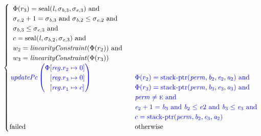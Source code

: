 \documentclass[a4paper]{article}
\newcommand{\tand}{\text{ and }}
\newcommand{\totherwise}{\text{otherwise }}
\newcommand{\sourcecolor}{\color{blue}}
\newcommand{\update}[2]{[#1 \mapsto #2]}
\newcommand{\updReg}[2]{\update{\reg.#1}{#2}}
\newcommand{\shareddom}[1]{\mathrm{#1}}
\newcommand{\perm}{\var{perm}}
\newcommand{\lin}{\var{l}}
\newcommand{\stkptr}[1]{\mathrm{stack\text{-}ptr}(#1)}
\newcommand{\seal}[1]{\shareddom{seal}(#1)}
\newcommand{\failed}{\mathrm{failed}}
\newcommand{\var}[1]{\mathit{#1}}
\newcommand{\reg}{\var{reg}}
\newcommand{\baddr}{\var{b}}
\newcommand{\eaddr}{\var{e}}
\newcommand{\aaddr}{\var{a}}
\newcommand{\plainperm}[1]{\textsc{#1}}
\newcommand{\enter}{\plainperm{e}}
\newcommand{\plainfun}[2]{
  \ifthenelse{\equal{#2}{}}
  {\mathit{#1}}
  {\mathit{#1}(#2)}
}
\newcommand{\updPcAddr}[1]{\plainfun{updatePc}{#1}}
\newcommand{\linCons}[1]{\plainfun{linearityConstraint}{#1}}
\begin{document}
\begin{align*}
\begin{cases}
\begin{array}[t]{l}
                                  \Phi(r_3) = \seal{\lin,\sigma_{\baddr,3},\sigma_{\eaddr,3}} \tand \\
                                  \sigma_{\eaddr,2}+1 = \sigma_{\baddr,3} \tand \sigma_{\baddr,2} \leq \sigma_{\eaddr,2} \tand\\
                                  \sigma_{\baddr,3} \leq \sigma_{\eaddr,3} \tand \\
                                  c = \seal{\lin,\sigma_{\baddr,2},\sigma_{\eaddr,3}} \tand \\
                                  w_2 = \linCons{\Phi(r_2)} \tand \\
                                  w_3 = \linCons{\Phi(r_3)} \\
                                \end{array}\\
                                \sourcecolor\left.
                                \updPcAddr{}\left(
                                \arraycolsep=0pt
                                \begin{array}{r l}
                                  \Phi&\updReg{r_2}{0}\\
                                      &\updReg{r_3}{0}\\
                                      &\updReg{r_1}{c}
                                \end{array}\right)\right.
&
                                \sourcecolor
                                \arraycolsep=0pt
                                \begin{array}[t]{l}
                                  \Phi(r_2) = \stkptr{\perm,\baddr_2,\eaddr_2,\aaddr_2} \tand \\
                                  \Phi(r_3) = \stkptr{\perm,\baddr_3,\eaddr_3,\aaddr_3} \tand \\
                                  \perm \neq \enter \tand \\
                                  \eaddr_2 + 1 = \baddr_3 \tand \baddr_2 \leq \eaddr2 \tand \baddr_3 \leq \eaddr_3 \tand \\
                                  c = \stkptr{\perm,\baddr_2,\eaddr_3,\aaddr_2} \\
                                \end{array}\\
                                \failed & \totherwise
                              \end{cases}
\end{align*}
\end{document}
